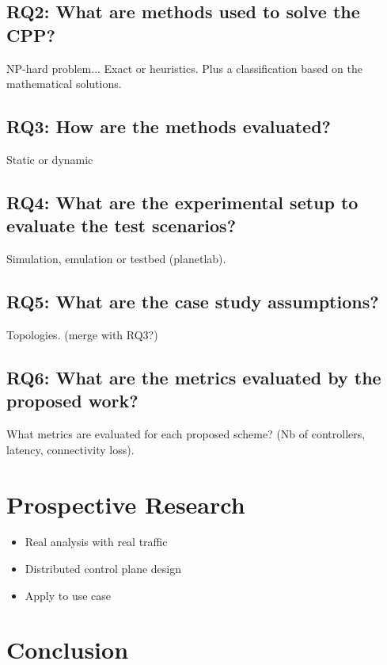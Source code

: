 \documentclass{IEEEtran}
\begin{document}
\subsection{RQ2: What are methods used to solve the CPP?}
NP-hard problem... Exact or heuristics. Plus a classification based on the mathematical solutions.
\subsection{RQ3: How are the methods evaluated?}
Static or dynamic
\subsection{RQ4: What are the experimental setup to evaluate the test scenarios?}
Simulation, emulation or testbed (planetlab).
\subsection{RQ5: What are the case study assumptions?}
Topologies. (merge with RQ3?)
\subsection{RQ6: What are the metrics evaluated by the proposed work?}
What metrics are evaluated for each proposed scheme? (Nb of controllers, latency, connectivity loss).

\section{Prospective Research}
\begin{itemize}
\item Real analysis with real traffic
\item Distributed control plane design
\item Apply to use case
\end{itemize}

\section{Conclusion}
\end{document}
